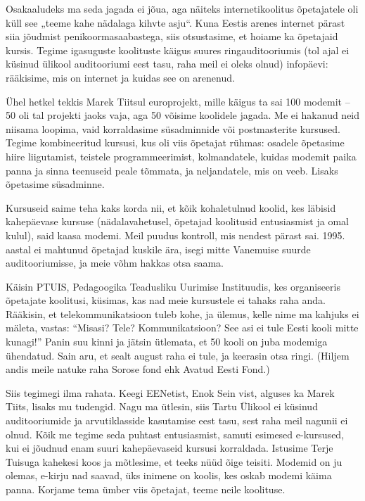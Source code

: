 Osakaaludeks ma seda jagada ei jõua, aga näiteks internetikoolitus 
õpetajatele oli küll see „teeme kahe nädalaga kihvte asju“. Kuna Eestis 
arenes internet pärast siia jõudmist
penikoormasaabastega, siis otsustasime, et hoiame ka õpetajaid 
kursis. Tegime igasuguste koolituste käigus suures ringauditooriumis (tol 
ajal ei küsinud ülikool auditooriumi eest tasu, raha meil ei oleks 
olnud) infopäevi: rääkisime, mis on internet ja kuidas see on arenenud. 

Ühel hetkel tekkis Marek Tiitsul 
europrojekt, mille käigus ta sai 100 modemit – 50 oli tal projekti jaoks vaja, 
aga 50 võisime koolidele jagada. Me ei hakanud neid niisama loopima, vaid 
korraldasime süsadminnide või postmasterite kursused. Tegime 
kombineeritud kursusi, kus oli viis õpetajat rühmas: osadele
õpetasime hiire liigutamist, teistele programmeerimist, 
kolmandatele, kuidas modemit paika panna ja sinna teenuseid peale 
tõmmata, ja neljandatele, mis on veeb. Lisaks õpetasime 
süsadminne. 

Kursuseid saime teha kaks korda nii, et kõik 
kohaletulnud koolid, kes läbisid kahepäevase kursuse (nädalavahetusel, õpetajad koolitusid entusiasmist ja omal kulul), 
said kaasa modemi. Meil puudus kontroll, mis nendest pärast sai. 1995. 
aastal ei mahtunud õpetajad kuskile ära, isegi mitte Vanemuise 
suurde auditooriumisse, ja meie võhm hakkas otsa 
saama. 

Käisin PTUIS, Pedagoogika Teadusliku Uurimise Instituudis, kes 
organiseeris õpetajate koolitusi, küsimas, kas nad meie kursustele ei tahaks 
raha anda. Rääkisin, et telekommunikatsioon tuleb kohe, ja 
ülemus, kelle nime ma kahjuks ei mäleta, vastas: \enquote{Misasi? Tele? 
Kommunikatsioon? See asi ei tule Eesti kooli mitte kunagi!} Panin suu kinni 
ja jätsin ütlemata, et 50 kooli on juba modemiga ühendatud. Sain aru, et sealt august raha ei tule, ja keerasin otsa 
ringi. (Hiljem andis meile natuke raha Sorose 
fond ehk Avatud Eesti Fond.)

Siis tegimegi ilma rahata. Keegi EENetist, Enok Sein vist, alguses ka Marek Tiits, lisaks mu 
tudengid. Nagu ma ütlesin, siis Tartu Ülikool ei küsinud 
auditooriumide ja arvutiklasside kasutamise eest tasu, sest raha meil nagunii ei olnud. 
Kõik me tegime seda puhtast entusiasmist, samuti esimesed e-kursused, kui ei jõudnud enam suuri kahepäevaseid kursusi 
korraldada. Istusime Terje Tuisuga kahekesi 
koos ja mõtlesime, et teeks nüüd õige teisiti. Modemid on ju olemas, 
e-kirju nad saavad, üks inimene on koolis, kes oskab modemi käima panna. 
Korjame tema ümber viis õpetajat, teeme neile koolituse. 

